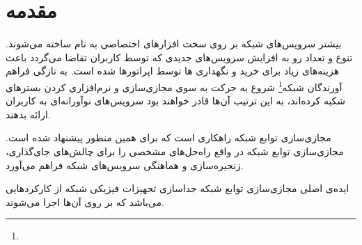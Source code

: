 \chapter{مقدمه}


بیشتر سرویس‌های شبکه بر روی سخت افزارهای اختصاصی به نام
ساخته می‌شوند.
تنوع و تعداد رو به افزایش سرویس‌های جدیدی که توسط کاربران تقاضا می‌گردد
باعث هزینه‌های زیاد برای خرید و نگهداری
‌ها
توسط اپراتورها شده است.
به تازگی فراهم آورندگان شبکه\footnote{}
شروع به حرکت به سوی مجازی‌سازی و نرم‌افزاری کردن بسترهای شکبه کرده‌اند،
به این ترتیب آن‌ها قادر خواهند بود
سرویس‌های نوآورانه‌ای به کاربران ارائه بدهند.

مجازی‌سازی توابع شبکه‌ راهکاری است که برای همین منظور پیشنهاد شده است.
مجازی‌سازی توابع شبکه‌ در واقع راه‌حل‌های مشخصی را برای چالش‌های جای‌گذاری،
زنجیره‌سازی و هماهنگی سرویس‌های شبکه فراهم می‌آورد.

ایده‌ی اصلی مجازی‌سازی توابع شبکه جداسازی تجهیزات فیزیکی شبکه از کارکردهایی می‌باشد که
بر روی آن‌ها اجرا می‌شوند.\cite{Mijumbi2016}